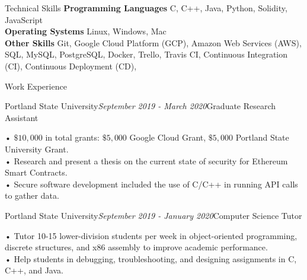 \documentclass{resume} %
\begin{document}
\begin{rSection}{Technical Skills}
  {\bf{Programming Languages}} C, C++, Java, Python, Solidity, JavaScript\\
  {\bf{Operating Systems}} Linux, Windows, Mac\\
  {\bf{Other Skills}} Git, Google Cloud Platform (GCP), Amazon Web Services (AWS), SQL, MySQL, PostgreSQL, Docker, Trello, Travis CI, Continuous Integration (CI), Continuous Deployment (CD), 

\end{rSection}


\begin{rSection}{Work Experience}

  \begin{rSubsection}{Portland State University}{{\em{September 2019 - March 2020}}}{Graduate Research Assistant}{}
\item • $\$10,000$ in total grants: $\$5,000$ Google Cloud Grant, $\$5,000$ Portland State University Grant.
  \\• Research and present a thesis on the current state of security for Ethereum Smart Contracts.
  \\• Secure software development included the use of C/C++ in running API calls to gather data.
\end{rSubsection}

  \begin{rSubsection}{Portland State University}{{\em{September 2019 - January 2020}}}{Computer Science Tutor}{}
\item • Tutor 10-15 lower-division students per week in object-oriented programming, discrete structures, and x86 assembly to improve academic performance.
\\• Help students in debugging, troubleshooting, and designing assignments in C, C++, and Java.
\end{rSubsection}

\end{rSection}

\end{document}
